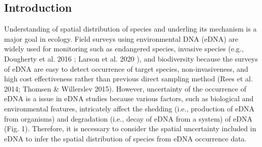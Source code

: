 \documentclass[12pt]{article}
\begin{document}
\newpage
\begin{linenumbers}
\section{Introduction}
Understanding of spatial distribution of species and underling its mechanism is a major goal in ecology. 
Field surveys using environmental DNA (eDNA) are widely used for monitoring such as endangered species, invasive species (e.g., Dougherty et al. 2016%
; Larson et al. 2020%
), and biodiversity 
because the surveys of eDNA are easy to detect occurrence of target species, non-invasiveness, and high cost effectiveness rather than previous direct sampling method (Rees et al. 2014; Thomsen \& Willerslev 2015). %
However, uncertainty of the occurrence of eDNA is a issue in eDNA studies because various factors, such as biological and environmental features, intricately affect the shedding (i.e., production of eDNA from organisms) and degradation (i.e., decay of eDNA from a system) of eDNA (Fig. 1). Therefore, it is necessary to consider the spatial uncertainty included in eDNA to infer the spatial distribution of species from eDNA occurrence data.




\end{linenumbers}
\end{document}

